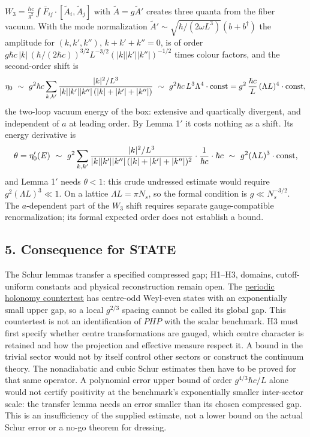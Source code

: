 \documentclass[11pt,a4paper]{article}
\begin{document}
\(W_3=\frac{\hbar c}{g^2}\int\bar F_{ij}\cdot[\tilde A_i,\tilde A_j]\)
with \(\tilde A=g\tilde A'\) creates three quanta from the fiber vacuum.
With the mode normalization
\(\tilde A'\sim\sqrt{\hbar/(2\omega L^3)}(b+b^\dagger)\) the amplitude
for \((k,k',k'')\), \(k+k'+k''=0\), is of order
\(g\hbar c\,|k|\,(\hbar/(2\hbar c))^{3/2}L^{-3/2}(|k||k'||k''|)^{-1/2}\)
times colour factors, and the second-order shift is
\[\eta_0\ \sim\ g^2\hbar c\sum_{k,k'}\frac{|k|^2/L^3}{|k||k'||k''|\,(|k|+|k'|+|k''|)}
\ \sim\ g^2\hbar c\,L^3\Lambda^4\cdot{\rm const}=g^2\,\frac{\hbar c}{L}\,(\Lambda L)^4\cdot{\rm const},\]
the two-loop vacuum energy of the box: extensive and quartically
divergent, and independent of \(a\) at leading order. By Lemma 1\('\) it
costs nothing as a shift. Its energy derivative is
\[\theta=\eta_0'(E)\ \sim\ g^2\sum_{k,k'}\frac{|k|^2/L^3}{|k||k'||k''|\,(|k|+|k'|+|k''|)^2}\cdot\frac{1}{\hbar c}\cdot\hbar c
\ \sim\ g^2(\Lambda L)^3\cdot{\rm const},\] and Lemma 1\('\) needs
\(\theta<1\): this crude undressed estimate would require
\(g^2(\Lambda L)^3\ll1\). On a lattice \(\Lambda L=\pi N_s\), so the
formal condition is \(g\ll N_s^{-3/2}\). The \(a\)-dependent part of the
\(W_3\) shift requires separate gauge-compatible renormalization; its
formal expected order does not establish a bound.

\hypertarget{consequence-for-state}{%
\subsection{5. Consequence for STATE}\label{consequence-for-state}}

The Schur lemmas transfer a specified compressed gap; H1--H3, domains,
cutoff-uniform constants and physical reconstruction remain open. The
\href{torus-valley-potential.md\#a-centre-odd-variational-countertest}{periodic
holonomy countertest} has centre-odd Weyl-even states with an
exponentially small upper gap, so a local \(g^{2/3}\) spacing cannot be
called its global gap. This countertest is not an identification of
\(PHP\) with the scalar benchmark. H3 must first specify whether centre
transformations are gauged, which centre character is retained and how
the projection and effective measure respect it. A bound in the trivial
sector would not by itself control other sectors or construct the
continuum theory. The nonadiabatic and cubic Schur estimates then have
to be proved for that same operator. A polynomial error upper bound of
order \(g^{4/3}\hbar c/L\) alone would not certify positivity at the
benchmark's exponentially smaller inter-sector scale: the transfer lemma
needs an error smaller than its chosen compressed gap. This is an
insufficiency of the supplied estimate, not a lower bound on the actual
Schur error or a no-go theorem for dressing.
\end{document}
